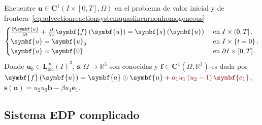 Encuentre
\begin{math}
	\symbf{u}\in
	\symbf{C}^{1}\left(I\times\left[0,T\right],\Omega\right)
\end{math}
en el problema de valor inicial y de frontera~\eqref{eq:advectionreactionsystemquaslinearnonhomogeneous}
\begin{equation}\label{eq:advectionreactionsystemquaslinearnonhomogeneous}
	\begin{cases}
		\diffp{\symbf{u}}{t}+\diffp{}{x}\symbf{f}\left(\symbf{u}\right)=
		\symbf{s}\left(\symbf{u}\right) & \text{ en }I\times\left(0,T\right].          \\
		\symbf{u}                                                      =
		\symbf{u}_{0}                   & \text{ en }I\times\left\{t=0\right\}.        \\
		\symbf{u}                                                       =
		\symbf{0}                       & \text{ en }\partial I\times\left[0,T\right].
	\end{cases}
\end{equation}
Donde
\begin{math}
	\symbf{u}_{0}\in
	{\symbf{L}^{\infty}_{\text{loc}}\left(I\right)}^{3}
\end{math},
\begin{math}
	\symbf{s}\colon\Omega\to
	\mathbb{R}^{3}
\end{math}
son conocidas y
\begin{math}
	\symbf{f}\in
	\symbf{C}^{1}\left(\Omega,\mathbb{R}^{3}\right)
\end{math}
es dada por
\begin{math}
	\symbf{f}\left(\symbf{u}\right)=
	\symbf{a}\odot\symbf{u}+
	\mathcolor{DarkRed}{a_{1}u_{1}\left(u_{2}-1\right)\symbf{e_{1}}}
\end{math},
\begin{math}
	\symbf{s}\left(\symbf{u}\right)=
	u_{2}u_{3}\symbf{b}-\beta u_{1}\symbf{e}_{1}
\end{math}.

\subsection*{\color{DarkRed}Sistema EDP complicado}

